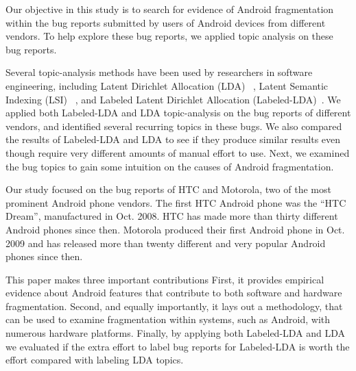 \documentclass[10pt, conference, compsocconf]{IEEEtran}
\begin{document}
Our objective in this study is to search for evidence of
Android
fragmentation within the bug reports submitted by users of Android devices
from different vendors. To help explore these bug reports, we applied topic analysis on these
bug reports. 

Several topic-analysis methods have been used by researchers in
software engineering, including Latent Dirichlet Allocation (LDA)~\cite{Asuncion:2010,Linstead:2009}
, Latent Semantic Indexing (LSI)~\cite{Marcus04aninformation}
, and Labeled Latent Dirichlet Allocation
(Labeled-LDA)~\cite{labeledlda}. We applied both
Labeled-LDA and LDA topic-analysis on the bug reports
of different vendors, and identified several recurring topics in these
bugs. 
We also compared the results of Labeled-LDA and LDA to see if they
produce similar results even though require very different amounts of
manual effort to use.
Next, we examined the bug topics to gain some intuition on the
causes of Android fragmentation.	

Our study focused on the bug reports of HTC and Motorola, two of the
most prominent Android phone vendors. The first HTC Android phone was
the ``HTC Dream'', manufactured in Oct. 2008. HTC has made more than
thirty different Android phones since then. Motorola produced their
first Android phone in Oct. 2009 and has released more than twenty
different and very popular Android phones since then. 
 
This paper makes three important contributions First, it provides
empirical evidence about Android features that contribute to both software
and hardware fragmentation. Second, and equally importantly, it lays
out a methodology, that can be used to examine fragmentation within
systems, such as Android, with numerous hardware platforms. Finally,
by applying both Labeled-LDA and LDA we evaluated if the extra effort
to label bug reports for Labeled-LDA is worth the effort compared with
labeling LDA topics.
\end{document}
